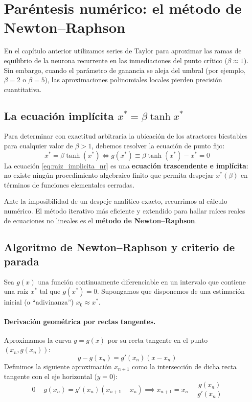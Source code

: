 \section{Paréntesis numérico: el método de Newton--Raphson}

En el capítulo anterior utilizamos series de Taylor para aproximar las ramas de equilibrio de la neurona recurrente en las inmediaciones del punto crítico ($\beta \approx 1$). Sin embargo, cuando el parámetro de ganancia se aleja del umbral (por ejemplo, $\beta = 2$ o $\beta = 5$), las aproximaciones polinomiales locales pierden precisión cuantitativa.

\subsection{La ecuación implícita $x^{*} = \beta\tanh x^{*}$}

Para determinar con exactitud arbitraria la ubicación de los atractores biestables para cualquier valor de $\beta > 1$, debemos resolver la ecuación de punto fijo:
\begin{equation}
    x^* = \beta \tanh(x^*) \iff g(x^*) \equiv \beta \tanh(x^*) - x^* = 0
    \label{eq:raiz_implicita_nr}
\end{equation}
La ecuación \eqref{eq:raiz_implicita_nr} es una \textbf{ecuación trascendente e implícita}: no existe ningún procedimiento algebraico finito que permita despejar $x^*(\beta)$ en términos de funciones elementales cerradas.

Ante la imposibilidad de un despeje analítico exacto, recurrimos al cálculo numérico. El método iterativo más eficiente y extendido para hallar raíces reales de ecuaciones no lineales es el \textbf{método de Newton--Raphson}.

\subsection{Algoritmo de Newton--Raphson y criterio de parada}

Sea $g(x)$ una función continuamente diferenciable en un intervalo que contiene una raíz $x^*$ tal que $g(x^*) = 0$. Supongamos que disponemos de una estimación inicial (o ``adivinanza'') $x_0 \approx x^*$.

\paragraph{Derivación geométrica por rectas tangentes.}
Aproximamos la curva $y = g(x)$ por su recta tangente en el punto $(x_n, g(x_n))$:
\begin{equation}
    y - g(x_n) = g'(x_n)(x - x_n)
\end{equation}
Definimos la siguiente aproximación $x_{n+1}$ como la intersección de dicha recta tangente con el eje horizontal ($y = 0$):
\begin{equation}
    0 - g(x_n) = g'(x_n)(x_{n+1} - x_n) \implies \boxed{x_{n+1} = x_n - \frac{g(x_n)}{g'(x_n)}}
    \label{eq:formula_newton_raphson}
\end{equation}

